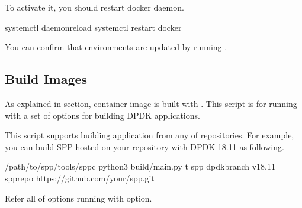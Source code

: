 \documentclass[a4paper,11pt,openany,oneside,english]{sphinxmanual}
\begin{document}
To activate it, you should restart docker daemon.

\begin{sphinxVerbatim}[commandchars=\\\{\},formatcom=\footnotesize]
 systemctl daemon\PYGZhy{}reload
 systemctl restart docker
\end{sphinxVerbatim}

You can confirm that environments are updated by running
.


\subsection{Build Images}
\label{\detokenize{tools/sppc/build_img:build-images}}\label{\detokenize{tools/sppc/build_img:spp-container-build-img}}\label{\detokenize{tools/sppc/build_img::doc}}
As explained in {\hyperref[\detokenize{tools/sppc/getting_started::doc}]{}} section,
container image is built with .
This script is for running  with a set of
 options for building DPDK applications.

This script supports building application from any of repositories.
For example, you can build SPP hosted on your repository
with DPDK 18.11 as following.

\begin{sphinxVerbatim}[commandchars=\\\{\},formatcom=\footnotesize]
  /path/to/spp/tools/sppc
 python3 build/main.py \PYGZhy{}t spp 
  \PYGZhy{}\PYGZhy{}dpdk\PYGZhy{}branch v18.11 
  \PYGZhy{}\PYGZhy{}spp\PYGZhy{}repo https://github.com/your/spp.git
\end{sphinxVerbatim}

Refer all of options running with  option.
\end{document}

